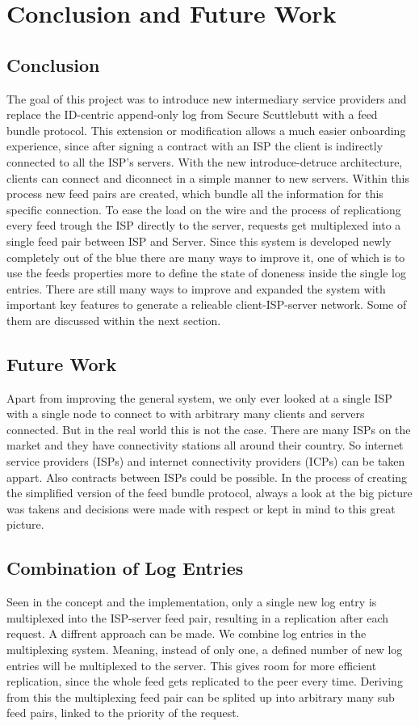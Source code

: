 \chapter{Conclusion and Future Work}
\section{Conclusion}
The goal of this project was to introduce new intermediary service providers and replace the ID-centric append-only log from Secure Scuttlebutt with a feed bundle protocol. This extension or modification allows a much easier onboarding experience, since after signing a contract with an ISP the client is indirectly connected to all the ISP's servers. With the new introduce-detruce architecture, clients can connect and diconnect in a simple manner to new servers. Within this process new feed pairs are created, which bundle all the information for this specific connection. To ease the load on the wire and the process of replicationg every feed trough the ISP directly to the server, requests get multiplexed into a single feed pair between ISP and Server.
Since this system is developed newly completely out of the blue there are many ways to improve it, one of which is to use the feeds properties more to define the state of doneness inside the single log entries. There are still many ways to improve and expanded the system with important key features to generate a relieable client-ISP-server network. Some of them are discussed within the next section.
\section{Future Work}
Apart from improving the general system, we only ever looked at a single ISP with a single node to connect to with arbitrary many clients and servers connected. But in the real world this is not the case. There are many ISPs on the market and they have connectivity stations all around their country. So internet service providers (ISPs) and internet connectivity providers (ICPs) can be taken appart. Also contracts between ISPs could be possible. In the process of creating the simplified version of the feed bundle protocol, always a look at the big picture was takens and decisions were made with respect or kept in mind to this great picture.

\section{Combination of Log Entries}
Seen in the concept and the implementation, only a single new log entry is multiplexed into the ISP-server feed pair, resulting in a replication after each request. A diffrent approach can be made. We combine log entries in the multiplexing system. Meaning, instead of only one, a defined number of new log entries will be multiplexed to the server. This gives room for more efficient replication, since the whole feed gets replicated to the peer every time. Deriving from this the multiplexing feed pair can be splited up into arbitrary many sub feed pairs, linked to the priority of the request. 
